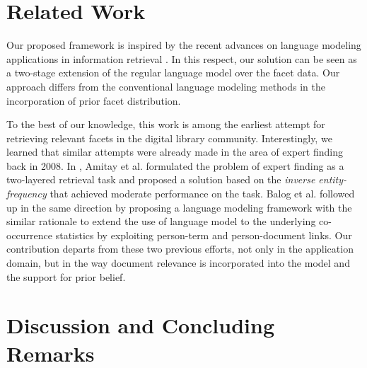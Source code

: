
\section{Related Work}\label{s:related-work}

Our proposed framework is inspired by the recent advances on language modeling
applications in information retrieval
\cite{lavrenko2001relevance,zaragorza2003bayesian}.  In this respect, our
solution can be seen as a two-stage extension of the regular language model
over the facet data.  Our approach differs from the conventional language
modeling methods in the incorporation of prior facet distribution.

To the best of our knowledge, this work is among the earliest attempt for
retrieving relevant facets in the digital library community.  Interestingly, we
learned that similar attempts were already made in the area of expert finding
back in 2008.  In \cite{amitay2008finding}, Amitay et al. formulated the
problem of expert finding as a two-layered retrieval task and proposed a
solution based on the \emph{inverse entity-frequency} that achieved moderate
performance on the task.  Balog et al. \cite{balog2009language} followed up in
the same direction by proposing a language modeling framework with the similar
rationale to extend the use of language model to the underlying co-occurrence
statistics by exploiting person-term and person-document links.  Our
contribution departs from these two previous efforts, not only in the
application domain, but in the way document relevance is incorporated into the
model and the support for prior belief.  
 
\section{Discussion and Concluding Remarks}\label{s:concluding-remarks}

